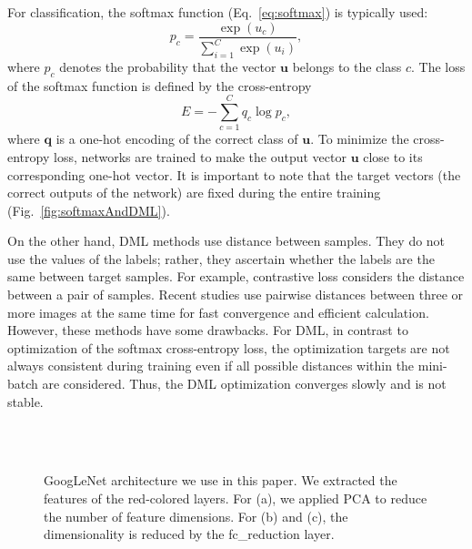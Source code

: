 \documentclass[9pt,technote,compsoc]{./sty/IEEEtran}
\newcommand{\Eref}[1]{Eq.~\ref{#1}}
\newcommand{\Fref}[1]{Fig.~\ref{#1}}
\begin{document}
For classification, the softmax function (\Eref{eq:softmax}) is typically used:
\begin{equation}
\label{eq:softmax}
p_c=\frac{\exp(u_c)}{\sum_{i=1}^{C} \exp(u_i)},
\end{equation}
where $p_c$ denotes the probability that the vector $\mathbf{u}$ belongs to the class $c$.
The loss of the softmax function is defined by the cross-entropy
\begin{equation}
E=-\sum_{c=1}^{C} q_c\log p_c,
\end{equation}
where $\mathbf{q}$ is a one-hot encoding of the correct class of $\mathbf{u}$.
To minimize the cross-entropy loss, networks are trained to make the output vector $\mathbf{u}$ close to its corresponding one-hot vector.
It is important to note that the target vectors (the correct outputs of the network) are fixed during the entire training (\Fref{fig:softmaxAndDML}).

On the other hand, DML methods use distance between samples.
They do not use the values of the labels; rather, they ascertain whether the labels are the same between target samples.
For example, contrastive loss \cite{hadsell2006dimensionality} considers the distance between a pair of samples.
Recent studies \cite{schroff2015facenet}\cite{song2016deep}\cite{song2017learnable}\cite{sohn2016improved} use pairwise distances between three or more images at the same time for fast convergence and efficient calculation.
However, these methods have some drawbacks.
For DML, in contrast to optimization of the softmax cross-entropy loss, the optimization targets are not always consistent during training even if all possible distances within the mini-batch are considered.
Thus, the DML optimization converges slowly and is not stable.



\begin{figure}[t]
	\centering
	\\
	\\
	\caption{	GoogLeNet \cite{szegedy2015going} architecture we use in this paper. We extracted the features of the red-colored layers. For (a), we applied PCA to reduce the number of feature dimensions. For (b) and (c), the dimensionality is reduced by the fc\_reduction layer.}
\end{figure}
\end{document}
